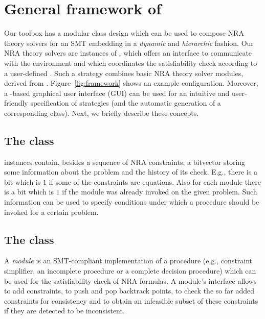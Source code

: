 \chapter{General framework of \smtrat}
\label{chapter:generalframework}


Our toolbox has a modular \Cpp class design which can be used to
compose NRA theory solvers for an SMT embedding in a \emph{dynamic} and \emph{hierarchic} fashion.
Our NRA theory solvers are instances of \managerClass,
which offers an interface to communicate with the environment and
which coordinates the satisfiability check according to a user-defined
\strategyClass. Such a strategy combines basic NRA theory solver modules, derived from \moduleClass.
Figure~\ref{fig:framework} shows an example configuration.
Moreover, a \Java-based graphical user interface (GUI) can be
used for an intuitive and user-friendly specification of strategies
(and the automatic generation of a corresponding \strategyClass
class).
Next, we briefly describe these concepts. 

\section{The \formulaClass class}
\formulaClass instances contain, besides a sequence of NRA
constraints, a bitvector storing some information about the problem
and the history of its check.  E.g., there is a bit which is 
$1$ if some of the constraints are equations. Also for each module
there is a bit which is $1$ if the module was already invoked
on the given problem. Such information can be used
to specify conditions under which a procedure should be invoked for
a certain problem.\smallskip

\section{The \moduleClass class}
A \emph{module} is an SMT-compliant implementation of a procedure
(e.g., constraint simplifier, an incomplete procedure or a complete decision
procedure) which can be used for the satisfiability check of NRA formulas. 
A module's interface allows to add 
constraints, to push and pop backtrack points, to check the so far
added constraints for consistency and to obtain an infeasible subset
of these constraints if they are detected to be inconsistent.

